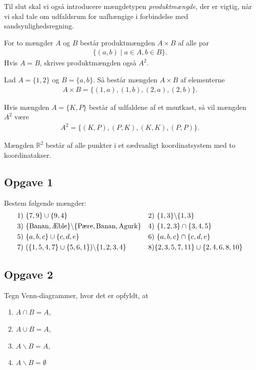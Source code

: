Til slut skal vi også introducere mængdetypen \textit{produktmængde}, der er vigtig, når vi skal tale om udfaldsrum for uafhængige i forbindelse med sandsynlighedsregning.
\begin{defn}[Produktmængde]
For to mængder $A$ og $B$ består produktmængden $A \times B$ af alle par
\begin{align*}
	\{(a,b) \mid a\in A, b \in B\}.
\end{align*}
Hvis $A = B$, skrives produktmængden også $A^2$.
\end{defn}
\begin{exa}
	Lad $A = \{1,2\}$ og $B = \{a,b\}$. Så består mængden $A \times B$ af elementerne
	\begin{align*}
		A \times B = \{(1,a),(1,b),(2,a),(2,b)\}.
	\end{align*}
\end{exa}
\begin{exa}
	Hvis mængden $A = \{K,P\}$ består af udfaldene af et møntkast, så vil mængden $A^2$ være
	\begin{align*}
		A^2 = \{(K,P),(P,K),(K,K),(P,P)\}.
	\end{align*}
\end{exa}
\begin{exa}
	Mængden $\mathbb{R}^2$ består af alle punkter i et sædvanligt koordinatsystem med to koordinatakser. 
\end{exa}

\subsection*{Opgave 1}
Bestem følgende mængder:
\begin{align*}
&1) \ \{7,9\} \cup \{9,4\}  &&2) \ \{1,3\} \backslash \{1,3\}    \\
&3) \ \{\textnormal{Banan},\textnormal{Æble}\} \backslash \{\textnormal{Pære},\textnormal{Banan},\textnormal{Agurk}\} &&4) \ \{1,2,3\} \cap \{3,4,5\}  \\
&5) \ \{a,b,c\} \cup \{c,d,e\}  &&6) \ \{a,b,c\} \cap \{c,d,e\}   \\
&7) \ (\{1,5,4,7 \} \cup \{5,6,1\}) \backslash \{1,2,3,4\}  &&8) \{2,3,5,7,11\} \cup \{2,4,6,8,10\}
\end{align*}
\subsection*{Opgave 2}
Tegn Venn-diagrammer, hvor det er opfyldt, at 
\begin{enumerate}[label = \roman*)]
	\item $A \cap B = A$,
	\item $A \cup B = A$,
	\item $A \backslash B = A$,
	\item $A \backslash B = \emptyset$
\end{enumerate}
